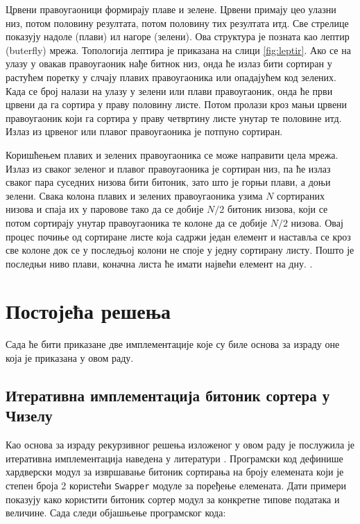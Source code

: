 \documentclass[12pt, a4paper]{article}
\theoremstyle{definition}
\begin{document}
Црвени правоугаоници формирају плаве и зелене. Црвени примају цео улазни низ, потом половину резултата, потом половину тих резултата итд. Све стрелице показују надоле (плави) ил нагоре (зелени). Ова структура је позната као лептир (buterfly) мрежа. Топологија лептира је приказана на слици \ref{fig:leptir}. Ако се на улазу у овакав правоугаоник нађе битнок низ, онда ће излаз бити сортиран у растућем поретку у слчају плавих правоугаоника или опадајућем код зелених. Када се број налази на улазу у зелени или плави правоугаоник, онда ће први црвени да га сортира у праву половину листе. Потом пролази кроз мањи црвени правоугаоник који га сортира у праву четвртину листе унутар те половине итд. Излаз из црвеног или плавог правоугаоника је потпуно сортиран.

Коришћењем плавих и зелених правоугаоника се може направити цела мрежа. Излаз из сваког зеленог и плавог правоугаоника је сортиран низ, па ће излаз сваког пара суседних низова бити битоник, зато што је горњи плави, а доњи зелени. Свака колона плавих и зелених правоугаоника узима $N$ сортираних низова и спаја их у паровове тако да се добије $N/2$ битоник низова, који се потом сортирају унутар правоугаоника те колоне да се добије $N/2$ низова. Овај процес почиње од сортиране листе која садржи један елемент и наставља се кроз све колоне док се у последњој колони не споје у једну сортирану листу. Пошто је последњи ниво плави, коначна листа ће имати највећи елемент на дну. \cite{wiki_bitonic}.

\newpage

\section{Постојећа решења}

Сада ће бити приказане две имплементације које су биле основа за израду оне која је приказана у овом раду.

\subsection{Итеративна имплементација битоник сортера у Чизелу}
Као основа за израду рекурзивног решења изложеног у овом раду је послужила је итеративна имплементација наведена у литератури \cite{git_freeChipsBitonic}.
Програмски код дефинише хардверски модул за извршавање битоник сортирања на броју елемената који је степен броја 2 користећи \verb+Swapper+ модуле за поређење елемената. Дати примери показују како користити битоник сортер модул за конкретне типове података и величине. Сада следи објашњење програмског кода:
\end{document}
